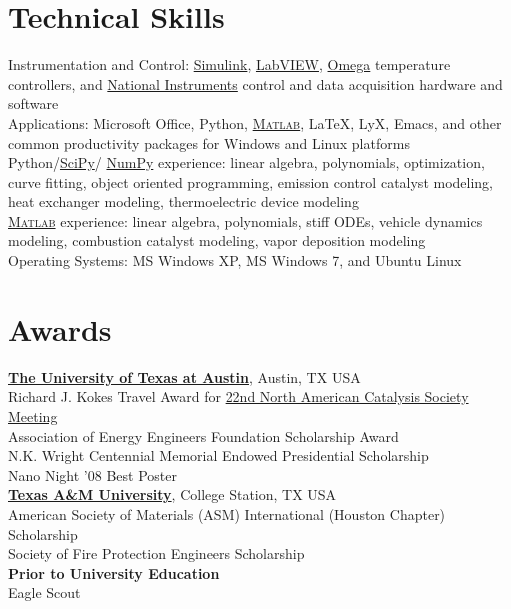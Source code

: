 \documentclass[centered]{res}
\begin{document}
\begin{resume}
\section{Technical Skills}
% 
Instrumentation and Control:
\href{http://www.mathworks.com/products/simulink/}{Simulink},
\href{http://www.ni.com/}{LabVIEW}, 
\href{http://www.omega.com/}{Omega} temperature controllers,
and
\href{http://www.ni.com}{National Instruments}
control and data acquisition hardware and software
\vspace{5pt} \\
%
Applications: Microsoft Office, Python,
\href{http://www.mathworks.com/products/matlab/}{\textsc{Matlab}},
  \LaTeX, LyX, Emacs, and other common productivity packages for
  Windows and Linux platforms
\vspace{5pt} \\
%
Python/\href{http://www.scipy.org/}{SciPy}/%
\href{http://numpy.scipy.org/}{NumPy}
experience: linear algebra, polynomials, optimization, curve fitting,
object oriented programming, emission control catalyst modeling, heat
exchanger modeling, thermoelectric device modeling
\vspace{5pt} \\
%
\href{http://www.mathworks.com/products/matlab/}{\textsc{Matlab}}
experience: linear algebra, polynomials, stiff ODEs, vehicle dynamics
modeling, combustion catalyst modeling, vapor deposition modeling
\vspace{5pt} \\
%
Operating Systems: MS Windows XP, MS Windows 7, and Ubuntu Linux
\vspace{5pt}
%
\section{Awards}
% 
\href{http://www.utexas.edu/}{\textbf{The University of Texas at
    Austin}}, Austin, TX USA \\
Richard J. Kokes Travel Award for
\href{http://www.22nam.org/}{22nd North American Catalysis Society
  Meeting} \\
Association of Energy Engineers Foundation Scholarship Award \\
N.K. Wright Centennial Memorial Endowed Presidential Scholarship \\
Nano Night '08 Best Poster \vspace{5pt} \\
%
\href{http://www.tamu.edu/}{\textbf{Texas A\&M University}}, College
Station, TX USA \\
American Society of Materials (ASM) International (Houston Chapter)
Scholarship \\
Society of Fire Protection Engineers Scholarship \vspace{5pt} \\
%
\textbf{Prior to University Education} \\
Eagle Scout

\end{resume}
\end{document}
